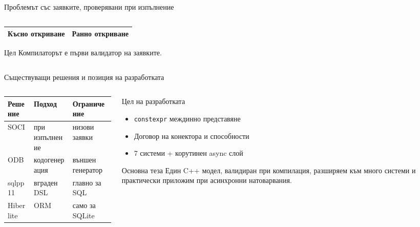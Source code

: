 \documentclass[aspectratio=169,12pt]{beamer}
\begin{document}
\begin{frame}{Проблемът със заявките, проверявани при изпълнение}
\begin{columns}[T]
\begin{column}{0.43\textwidth}
\begin{tabularx}{\linewidth}{@{}XX@{}}
                Късно откриване &
                    Ранно откриване\\
                \bottomrule
            \end{tabularx}
            \vspace{0.02em}
            \begin{alertblock}{Цел}
                {\small Компилаторът е първи
                валидатор на заявките.}
            \end{alertblock}
        \end{column}
    \end{columns}
\end{frame}

\begin{frame}{Съществуващи решения и позиция на разработката}
    \small
    \begin{columns}[T]
        \begin{column}{0.52\textwidth}
            \footnotesize
            \begin{tabular}{@{}p{1.6cm}p{2.6cm}p{2.9cm}@{}}
                \toprule
                \textbf{Решение} & \textbf{Подход} & \textbf{Ограничение}\\
                \midrule
                SOCI      & при изпълнение     & низови заявки\\
                ODB       & кодогенерация      & външен генератор\\
                sqlpp11   & вграден DSL        & главно за SQL\\
                Hiberlite & ORM                & само за SQLite\\
                \bottomrule
            \end{tabular}
        \end{column}
        \begin{column}{0.45\textwidth}
            \begin{block}{Цел на разработката}
                \begin{itemize}\footnotesize
                    \setlength{\itemsep}{0.1em}
                    \item \texttt{constexpr} междинно представяне
                    \item Договор на конектора и способности
                    \item 7 системи + корутинен async слой
                \end{itemize}
            \end{block}
            \begin{alertblock}{Основна теза}
                {\footnotesize Един C++ модел, валидиран при компилация, разширяем към много системи и практически приложим при асинхронни натоварвания.}
            \end{alertblock}
        \end{column}
    \end{columns}
\end{frame}
\end{document}
